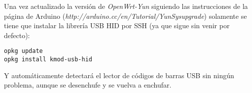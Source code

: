 Una vez actualizado la versión de \emph{OpenWrt-Yun} siguiendo las instrucciones de la página de Arduino (\emph{http://arduino.cc/en/Tutorial/YunSysupgrade}) solamente se tiene que instalar la librería USB HID por SSH (ya que sigue sin venir por defecto):

    \begin{lstlisting}
opkg update
opkg install kmod-usb-hid
    \end{lstlisting}

Y automáticamente detectará el lector de códigos de barras USB sin ningún problema, aunque se desenchufe y se vuelva a enchufar.